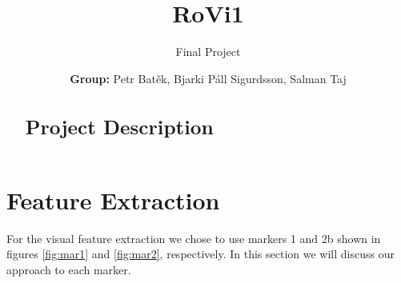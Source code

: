 \documentclass[]{scrartcl}
\title{RoVi1}
\subtitle{Final Project \vspace{2cm}}
\author{\textbf{Group:} Petr Batěk,  Bjarki Páll Sigurdsson, Salman Taj}
\begin{document}
	
	\maketitle
	
	\newpage

\begin{abstract}
\section*{Project Description}

\end{abstract}

\section{Feature Extraction}
For the visual feature extraction we chose to use markers 1 and 2b shown in figures \ref{fig:mar1} and \ref{fig:mar2}, respectively. In this section we will discuss our approach to each marker.
\end{document}

